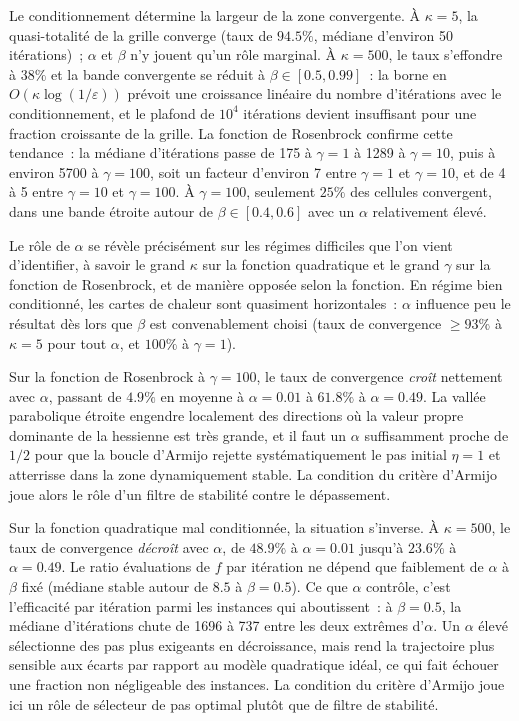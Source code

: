 \documentclass[10pt,a4paper]{article}
\begin{document}
Le conditionnement détermine la largeur de la zone convergente. À $\kappa = 5$, la quasi-totalité de la grille converge (taux de $94.5\%$, médiane d'environ 50 itérations)~; $\alpha$ et $\beta$ n'y jouent qu'un rôle marginal. À $\kappa = 500$, le taux s'effondre à $38\%$ et la bande convergente se réduit à $\beta \in [0.5, 0.99]$~: la borne en $O(\kappa \log(1/\varepsilon))$ prévoit une croissance linéaire du nombre d'itérations avec le conditionnement, et le plafond de $10^4$ itérations devient insuffisant pour une fraction croissante de la grille. La fonction de Rosenbrock confirme cette tendance~: la médiane d'itérations passe de 175 à $\gamma = 1$ à 1289 à $\gamma = 10$, puis à environ 5700 à $\gamma = 100$, soit un facteur d'environ 7 entre $\gamma = 1$ et $\gamma = 10$, et de 4 à 5 entre $\gamma = 10$ et $\gamma = 100$. À $\gamma = 100$, seulement $25\%$ des cellules convergent, dans une bande étroite autour de $\beta \in [0.4, 0.6]$ avec un $\alpha$ relativement élevé.

Le rôle de $\alpha$ se révèle précisément sur les régimes difficiles que l'on vient d'identifier, à savoir le grand $\kappa$ sur la fonction quadratique et le grand $\gamma$ sur la fonction de Rosenbrock, et de manière opposée selon la fonction. En régime bien conditionné, les cartes de chaleur sont quasiment horizontales~: $\alpha$ influence peu le résultat dès lors que $\beta$ est convenablement choisi (taux de convergence $\geq 93\%$ à $\kappa = 5$ pour tout $\alpha$, et $100\%$ à $\gamma = 1$).

Sur la fonction de Rosenbrock à $\gamma = 100$, le taux de convergence \emph{croît} nettement avec $\alpha$, passant de $4.9\%$ en moyenne à $\alpha = 0.01$ à $61.8\%$ à $\alpha = 0.49$. La vallée parabolique étroite engendre localement des directions où la valeur propre dominante de la hessienne est très grande, et il faut un $\alpha$ suffisamment proche de $1/2$ pour que la boucle d'Armijo rejette systématiquement le pas initial $\eta = 1$ et atterrisse dans la zone dynamiquement stable. La condition du critère d'Armijo joue alors le rôle d'un filtre de stabilité contre le dépassement.

Sur la fonction quadratique mal conditionnée, la situation s'inverse. À $\kappa = 500$, le taux de convergence \emph{décroît} avec $\alpha$, de $48.9\%$ à $\alpha = 0.01$ jusqu'à $23.6\%$ à $\alpha = 0.49$. Le ratio évaluations de $f$ par itération ne dépend que faiblement de $\alpha$ à $\beta$ fixé (médiane stable autour de $8.5$ à $\beta = 0.5$). Ce que $\alpha$ contrôle, c'est l'efficacité par itération parmi les instances qui aboutissent~: à $\beta = 0.5$, la médiane d'itérations chute de 1696 à 737 entre les deux extrêmes d'$\alpha$. Un $\alpha$ élevé sélectionne des pas plus exigeants en décroissance, mais rend la trajectoire plus sensible aux écarts par rapport au modèle quadratique idéal, ce qui fait échouer une fraction non négligeable des instances. La condition du critère d'Armijo joue ici un rôle de sélecteur de pas optimal plutôt que de filtre de stabilité.
\end{document}
